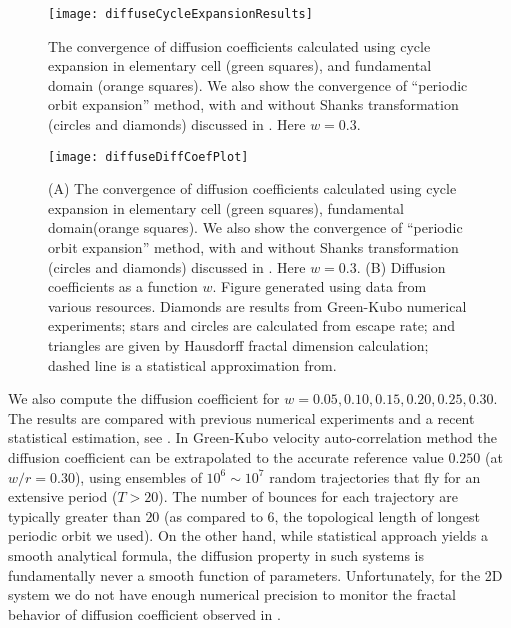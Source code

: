 \begin{figure}
	\texttt{[image: diffuseCycleExpansionResults]}
	\caption{\label{fig-convergence}The convergence of diffusion 
	coefficients  calculated using cycle		
		expansion in elementary cell (green squares), and fundamental 
		domain (orange squares). We also show the convergence of 
		``periodic orbit expansion'' method, with and  without Shanks 
		transformation (circles and diamonds) discussed in  
		. Here $w = 0.3$.
		}
\end{figure}
\begin{figure}
	\texttt{[image: diffuseDiffCoefPlot]}
	\caption[Diffusion coefficients computed using cycle expansion 
	formulas]{\label{fig-results} 
		(A) The convergence of diffusion coefficients  calculated 
		using cycle
		expansion in elementary cell (green squares),  fundamental
		domain(orange squares). We  also show the convergence of 
		``periodic
		orbit expansion'' method, with and  without Shanks 
		transformation
		(circles and diamonds) discussed in  . 
		Here $w =
		0.3$. (B) Diffusion coefficients as a function $w$.  Figure
		generated using data from various resources. Diamonds are 
		results
		from  Green-Kubo numerical experiments;
		stars and  circles are calculated 
		from
		escape rate; and triangles are  given by Hausdorff fractal 
		dimension
		calculation; dashed line  is a statistical
		approximation from.}
\end{figure}

We also compute the diffusion coefficient for $w = 0.05, 0.10, 0.15,
0.20, 0.25, 0.30$. The results are compared with previous numerical
experiments and a recent statistical estimation, see
. In Green-Kubo velocity auto-correlation method
the  diffusion coefficient can be extrapolated to the accurate
reference value $0.250$ (at $w/r=0.30$), using ensembles of
$10^6\sim10^7$ random trajectories that fly for an extensive period
($T > 20$). The number of bounces for each trajectory are
typically greater than $20$ (as compared to 6, the topological length
of longest periodic orbit we used). On the other hand, while
statistical approach yields a smooth analytical formula,
the diffusion property in such systems is fundamentally never a 
smooth function of parameters. Unfortunately, for 
the 2D system we do not have enough numerical precision to monitor 
the fractal behavior of diffusion coefficient observed in 
. 

